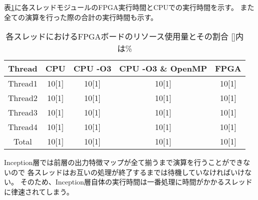 {表\ref{table:exec_time}に各スレッドモジュールのFPGA実行時間とCPUでの実行時間を示す。
また全ての演算を行った際の合計の実行時間も示す。

\begin{table}[p]
    \begin{center}
    \caption{各スレッドにおけるFPGAボードのリソース使用量とその割合 []内は\%}
    \label{table:exec_time}
    \begin{tabular}{|c|c|c|c|c|} \hline
    \multicolumn{1}{|c|}{Thread} & \multicolumn{1}{|c|}{CPU} & \multicolumn{1}{|c|}{CPU -O3} & \multicolumn{1}{|c|}{CPU -O3 \& OpenMP} & \multicolumn{1}{|c|}{FPGA} \\ \hline \hline
    Thread1       & 10[1] & 10[1] & 10[1] & 10[1] \\ \hline
    Thread2       & 10[1] & 10[1] & 10[1] & 10[1] \\ \hline
    Thread3       & 10[1] & 10[1] & 10[1] & 10[1] \\ \hline
    Thread4       & 10[1] & 10[1] & 10[1] & 10[1] \\ \hline
    Total       & 10[1] & 10[1] & 10[1] & 10[1] \\ \hline
    \end{tabular}
    \end{center}
\end{table}

Inception層では前層の出力特徴マップが全て揃うまで演算を行うことができないので
各スレッドはお互いの処理が終了するまでは待機していなければいけない。
そのため、Inception層自体の実行時間は一番処理に時間がかかるスレッドに律速されてしまう。
}
